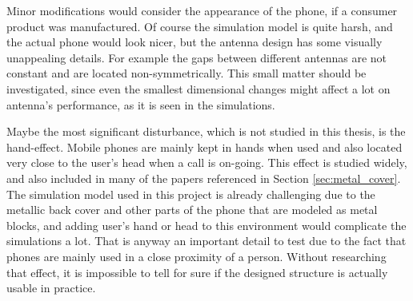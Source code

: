 Minor modifications would consider the appearance of the phone, if a consumer product was manufactured. Of course the simulation model is quite harsh, and the actual phone would look nicer, but the antenna design has some visually unappealing details. For example the gaps between different antennas are not constant and are located non-symmetrically. This small matter should be investigated, since even the smallest dimensional changes might affect a lot on antenna's performance, as it is seen in the simulations.

Maybe the most significant disturbance, which is not studied in this thesis, is the hand-effect. Mobile phones are mainly kept in hands when used and also located very close to the user's head when a call is on-going. This effect is studied widely, and also included in many of the papers referenced in Section \ref{sec:metal_cover}. The simulation model used in this project is already challenging due to the metallic back cover and other parts of the phone that are modeled as metal blocks, and adding user's hand or head to this environment would complicate the simulations a lot. That is anyway an important detail to test due to the fact that phones are mainly used in a close proximity of a person. Without researching that effect, it is impossible to tell for sure if the designed structure is actually usable in practice.


\clearpage